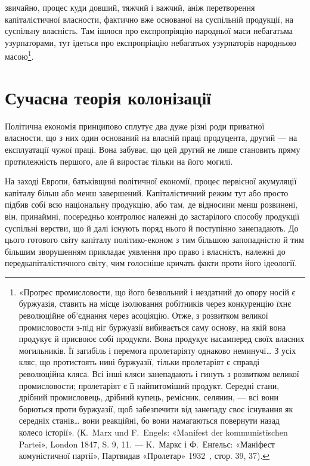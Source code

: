 \parcont{}  %
звичайно, процес куди довший, тяжчий і важчий, аніж перетворення
капіталістичної власности, фактично вже основаної на суспільній
продукції, на суспільну власність. Там ішлося про експропріяцію
народньої маси небагатьма узурпаторами, тут ідеться
про експропріацію небагатьох узурпаторів народньою масою\footnote{
«Проґрес промисловости, що його безвольний і нездатний до
опору носій є буржуазія, ставить на місце ізолювання робітників через
конкуренцію їхнє революційне об’єднання через асоціяцію. Отже, з розвитком
великої промисловости з-під ніг буржуазії вибивається саму основу,
на якій вона продукує й присвоює собі продукти. Вона продукує насамперед
своїх власних могильників. Її загибіль і перемога пролетаріяту
однаково неминучі\dots{} З усіх кляс, що протистоять нині буржуазії, тільки
пролетаріят є справді революційна кляса. Всі інші кляси занепадають і
гинуть з розвитком великої промисловости; пролетаріят є її найпитоміший
продукт. Середні стани, дрібний промисловець, дрібний купець, ремісник,
селянин, — всі вони борються проти буржуазії, щоб забезпечити від
занепаду своє існування як середніх станів\dots{} вони реакційні, бо вони
намагаються повернути назад колесо історії». (К.~Marx und F.~Engels:
«Manifest der kommunistischen Partei», London 1847, S. 9, 11. — K.~Маркс
і Ф.~Енґельс: «Маніфест комуністичної партії», Партвидав «Пролетар»
1932~, стор. 39, 37).
}.

\section[Сучасна теорія колонізації]{Сучасна теорія колонізації\footnotemark{}}

Політична економія принципово сплутує два дуже різні
роди приватної власности, що з них один оснований на власній
праці продуцента, другий — на експлуатації чужої праці.
Вона забуває, що цей другий не лише становить пряму протилежність
першого, але й виростає тільки на його могилі.

На заході Европи, батьківщині політичної економії, процес
первісної акумуляції капіталу більш або менш завершений.
Капіталістичний режим тут або просто підбив собі всю національну
продукцію, або там, де відносини менш розвинені, він, принаймні,
посередньо контролює належні до застарілого способу
продукції суспільні верстви, що й далі існують поряд нього й
поступінно занепадають. До цього готового світу капіталу політико-економ
з тим більшою запопадністю й тим більшим
зворушенням прикладає уявлення про право і власність, належні
до передкапіталістичного світу, чим голосніше кричать
факти проти його ідеології.

